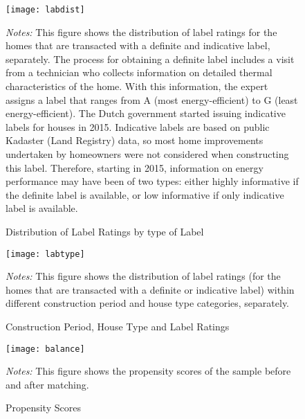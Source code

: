 \documentclass[12pt]{article}
\begin{document}
\begin{figure}[H]
\footnotesize
\caption{Distribution of Label Ratings by type of Label}
\begin{center}
\texttt{[image: labdist]}
		\scriptsize
		\begin{tablenotes}
		\scriptsize
\item \textit{Notes:} This figure shows the distribution of label ratings for the homes that are transacted with a definite and indicative label, separately. The process for obtaining a definite label includes a visit from a technician who collects information on detailed thermal characteristics of the home. With this information, the expert assigns a label that ranges from A (most energy-efficient) to G (least energy-efficient). The Dutch government started issuing indicative labels for houses in 2015. Indicative labels are based on public Kadaster (Land Registry) data, so most home improvements undertaken by homeowners were not considered when constructing this label. Therefore, starting in 2015, information on energy performance may have been of two types: either highly informative if the definite label is available, or low informative if only indicative label is available. 


\end{tablenotes}
		
\end{center}
\end{figure}



\begin{figure}[H]
\footnotesize
\caption{Construction Period, House Type and Label Ratings}
\begin{center}
\texttt{[image: labtype]}
		\scriptsize
		\begin{tablenotes}
		\scriptsize
\item \textit{Notes:} This figure shows the distribution of label ratings (for the homes that are transacted with a definite or indicative label) within different construction period and house type categories, separately.
\end{tablenotes}
		
\end{center}
\end{figure}



\begin{figure}[H]
\footnotesize
\caption{Propensity Scores}
\begin{center}
\texttt{[image: balance]}
		\scriptsize
		\begin{tablenotes}
		\scriptsize
\item \textit{Notes:} This figure shows the propensity scores of the sample before and after matching.
\end{tablenotes}
		
\end{center}
\end{figure}
\end{document}
